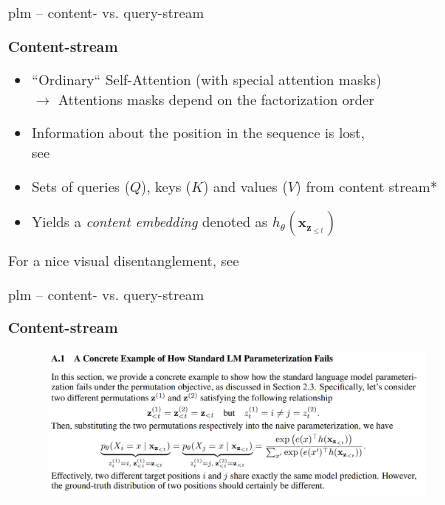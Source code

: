 
\begin{frame}{plm -- content- vs. query-stream}

\vfill

	\textbf{Content-stream}
	
	\begin{itemize}
		\item ``Ordinary`` Self-Attention (with special attention masks)\\
					$\rightarrow$ Attentions masks depend on the factorization order
		\item Information about the position in the sequence is lost,\\
					see 
		\item Sets of queries ($Q$), keys ($K$) and values ($V$) from content stream*
		\item Yields a \textit{content embedding} denoted as $h_{\theta}(\mathbf{x}_{\mathbf{z}_{\leq t}})$
	\end{itemize}
	
\vfill

	{\footnotesize *For a nice visual disentanglement, see }
	
\end{frame}


\begin{frame}{plm -- content- vs. query-stream}

\vfill

	\textbf{Content-stream}
	
	\begin{figure}
		\centering
		\includegraphics[width = 10cm]{figure/61-xlnet-a1.png}\\ 
	\end{figure}
	
\vfill

\end{frame}

